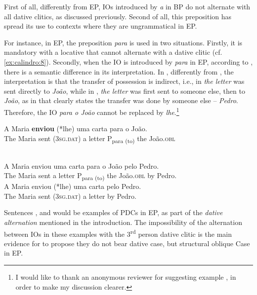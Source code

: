 \documentclass[output=paper,colorlinks,citecolor=brown,nonflat]{./langscibook}
\begin{document}
First of all, differently from EP, IOs introduced by \textit{a} in BP do not alternate with all dative clitics, as discussed previously. Second of all, this preposition has spread its use to contexts where they are ungrammatical in EP.

For instance, in EP, the preposition \textit{para} is used in two situations. Firstly, it is mandatory with a locative that cannot alternate with a dative clitic (cf. \ref{ex:calindro:8}). Secondly, when the IO is introduced by \textit{para} in EP, according to \citet{TorresMorais2007}, there is a semantic difference in its interpretation. In , differently from , the interpretation is that the transfer of possession is indirect, i.e., in  \textit{the letter} was sent directly to \textit{João}, while in , \textit{the letter} was first sent to someone else, then to \textit{João}, as in  that clearly states the transfer was done by someone else – \textit{Pedro}. Therefore, the IO \textit{para o João} cannot be replaced by \textit{lhe}.\footnote{I would like to thank an anonymous reviewer for suggesting example , in order to make my discussion clearer.} 

\ea%
    \label{ex:calindro:12}
    \gll A Maria \textbf{enviou} (*lhe) uma carta {para} {o}  {João}.\\
       The Maria sent (\textsc{3sg.dat}) a letter P{\textsubscript{para (to)}} {the} {João}.\textsc{obl}\\
    \glt ~\hfill \citep[96]{TorresMorais2007}
    \z

\ea%
    \label{ex:calindro:13}
    \ea\label{ex:calindro:13a}
    \gll A Maria     enviou   uma carta    para o João              pelo Pedro.\\
    The Maria  sent  a letter        P{\textsubscript{para (to)}} {the} {João}.\textsc{obl} by Pedro.\\
    \ex\label{ex:calindro:13b}
    \gll A Maria    enviou (*lhe)  uma carta    pelo Pedro.\\
    The Maria  sent (\textsc{3sg.dat})     a letter         by Pedro.\\   
    \z
\z

Sentences ,  and  would be examples of PDCs in EP, as part of the \textit{dative alternation} mentioned in the introduction. The impossibility of the alternation between IOs in these examples with the 3\textsuperscript{rd} person dative clitic is the main evidence for \citet{TorresMorais2007} to propose they do not bear dative case, but structural oblique Case in EP.
\end{document}
